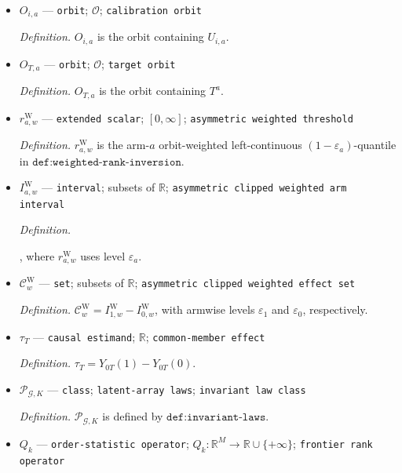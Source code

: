 \documentclass{article}
\begin{document}
\begin{itemize}
  \item \(O_{i,a}\) --- \texttt{orbit}; \(\mathcal O\); \texttt{calibration orbit}
  \par\smallskip\noindent\emph{Definition.} \(O_{i,a}\) is the orbit containing \(U_{i,a}\).
  \item \(O_{T,a}\) --- \texttt{orbit}; \(\mathcal O\); \texttt{target orbit}
  \par\smallskip\noindent\emph{Definition.} \(O_{T,a}\) is the orbit containing \(T^a\).
  \item \(r^{\mathrm W}_{a,w}\) --- \texttt{extended scalar}; \([0,\infty]\); \texttt{asymmetric weighted threshold}
  \par\smallskip\noindent\emph{Definition.} \(r^{\mathrm W}_{a,w}\) is the arm-\(a\) orbit-weighted left-continuous \((1-\varepsilon_a)\)-quantile in \(\texttt{def:weighted-rank-inversion}\).
  \item \(I^{\mathrm W}_{a,w}\) --- \texttt{interval}; subsets of \(\mathbb R\); \texttt{asymmetric clipped weighted arm interval}
  \par\smallskip\noindent\emph{Definition.} \par\noindent {}\par\noindent, where \(r^{\mathrm W}_{a,w}\) uses level \(\varepsilon_a\).
  \item \(\mathcal C^{\mathrm W}_w\) --- \texttt{set}; subsets of \(\mathbb R\); \texttt{asymmetric clipped weighted effect set}
  \par\smallskip\noindent\emph{Definition.} \(\mathcal C^{\mathrm W}_w=I^{\mathrm W}_{1,w}-I^{\mathrm W}_{0,w}\), with armwise levels \(\varepsilon_1\) and \(\varepsilon_0\), respectively.
  \item \(\tau_T\) --- \texttt{causal estimand}; \(\mathbb R\); \texttt{common-\allowbreak{}member effect}
  \par\smallskip\noindent\emph{Definition.} \(\tau_T=Y_{0T}(1)-Y_{0T}(0)\).
  \item \(\mathcal P_{\mathcal G,K}\) --- \texttt{class}; \texttt{latent-\allowbreak{}array laws}; \texttt{invariant law class}
  \par\smallskip\noindent\emph{Definition.} \(\mathcal P_{\mathcal G,K}\) is defined by \(\texttt{def:invariant-laws}\).
  \item \(Q_k\) --- \texttt{order-\allowbreak{}statistic operator}; \(Q_k:\mathbb R^M\to\mathbb R\cup\{+\infty\}\); \texttt{frontier rank operator}

\end{itemize}
\end{document}
